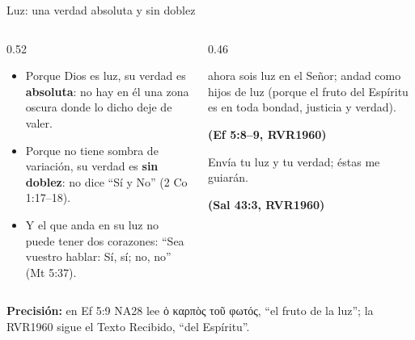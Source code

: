 \documentclass[hyperref={bookmarks=false},aspectratio=169]{beamer}
\newcommand{\grc}[1]{\foreignlanguage{ancientgreek}{#1}}
\newcommand{\fuente}[1]{\par\hfill{\upshape\bfseries\footnotesize\textcolor{azul}{#1}}}
\newcommand{\destacar}[1]{\textbf{\textcolor{azul}{#1}}}
\newcommand{\precision}[1]{{\footnotesize\color{gris}\textbf{Precisión:} #1}}
\begin{document}
\begin{frame}{Luz: una verdad absoluta y sin doblez}
\begin{columns}[t,onlytextwidth]
\begin{column}{0.52\textwidth}\small
\begin{itemize}
\item Porque Dios es luz, su verdad es \destacar{absoluta}: no hay en él una zona oscura donde lo dicho deje de valer.
\item Porque no tiene sombra de variación, su verdad es \destacar{sin doblez}: no dice ``Sí y No'' (2 Co 1:17--18).
\item Y el que anda en su luz no puede tener dos corazones: ``Sea vuestro hablar: Sí, sí; no, no'' (Mt 5:37).
\end{itemize}
\end{column}
\begin{column}{0.46\textwidth}
\begin{cita}ahora sois luz en el Señor; andad como hijos de luz (porque el fruto del Espíritu es en toda bondad, justicia y verdad).\fuente{(Ef 5:8--9, RVR1960)}\end{cita}
\begin{cita}Envía tu luz y tu verdad; éstas me guiarán.\fuente{(Sal 43:3, RVR1960)}\end{cita}
\end{column}
\end{columns}\par\smallskip
\precision{en Ef 5:9 NA28 lee \grc{ὁ καρπὸς τοῦ φωτός}, ``el fruto de la luz''; la RVR1960 sigue el Texto Recibido, ``del Espíritu''.}
\end{frame}
\end{document}

